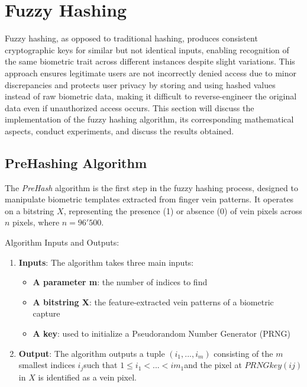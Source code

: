 

\section{Fuzzy Hashing}
\label{sec:Fuzzy Hashing}
Fuzzy hashing, as opposed to traditional hashing, produces consistent cryptographic keys for similar but not identical inputs, enabling recognition of the same biometric trait across different instances despite slight variations. This approach ensures legitimate users are not incorrectly denied access due to minor discrepancies and protects user privacy by storing and using hashed values instead of raw biometric data, making it difficult to reverse-engineer the original data even if unauthorized access occurs. 
This section will discuss the implementation of the fuzzy hashing algorithm, its corresponding mathematical aspects, conduct experiments, and discuss the results obtained.

\subsection{PreHashing Algorithm}

The \textit{PreHash} algorithm is the first step in the fuzzy hashing process, designed to manipulate biometric templates extracted from finger vein patterns. It operates on a bitstring \(X\), representing the presence (1) or absence (0) of vein pixels across \(n\) pixels, where \(n=96'500\).

Algorithm Inputs and Outputs:
\begin{enumerate}
    \item \textbf{Inputs}: The algorithm takes three main inputs:
    \begin{itemize}
        \item \textbf{A parameter m}: the number of indices to find
        \item \textbf{A bitstring X}: the feature-extracted vein patterns of a biometric capture
        \item \textbf{A key}: used to initialize a Pseudorandom Number Generator (PRNG)
    \end{itemize}
    \item \textbf{Output}: The algorithm outputs a tuple \((i_1,...,i_m)\) consisting of the \(m\) smallest indices \(i_j\)​ such that \(1≤i_1<...<im_1\)​ and the pixel at \(PRNGkey(ij)\) in \(X\) is identified as a vein pixel. 
\end{enumerate}

